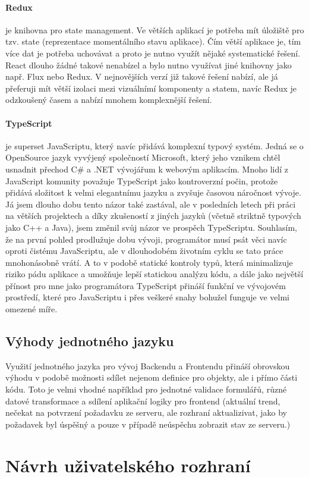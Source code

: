 \paragraph{Redux} je knihovna pro state management. Ve větších aplikací je potřeba mít úložiště pro tzv. state (reprezentace momentálního stavu aplikace). Čím větší aplikace je, tím více dat je potřeba uchovávat a proto je nutno využít nějaké systematické řešení. React dlouho žádné takové nenabízel a bylo nutno využívat jiné knihovny jako např. Flux nebo Redux. V nejnovějších verzí již takové řešení nabízí, ale já přeferuji mít větší izolaci mezi vizuálnímí komponenty a statem, navíc Redux je odzkoušený časem a nabízí mnohem komplexnější řešení.

\paragraph{TypeScript} je superset JavaScriptu, který navíc přidává komplexní typový systém. Jedná se o OpenSource jazyk vyvýjený společností Microsoft, který jeho vznikem chtěl usnadnit přechod C\# a .NET vývojářum k webovým aplikacím. Mnoho lidí z JavaScript komunity považuje TypeScript jako kontroverzní počin, protože přidává složitost k velmi elegantnímu jazyku a zvyšuje časovou náročnost vývoje. Já jsem dlouho dobu tento názor také zastával, ale v posledních letech při práci na větších projektech a díky zkušeností z jiných jazyků (včetně striktně typových jako C++ a Java), jsem změnil svůj názor ve prospěch TypeScriptu. Souhlasím, že na první pohled prodlužuje dobu vývoji, programátor musí psát věci navíc oproti čistému JavaScriptu, ale v dlouhodobém životním cyklu se tato práce  mnohonásobně vrátí. A to v podobě statické kontroly typů, která minimalizuje riziko pádu aplikace a umožňuje  lepší statickou analýzu kódu, a dále jako největší přínost pro mne jako programátora TypeScript přináší funkční  ve vývojovém prostředí, které pro JavaScriptu i přes veškeré snahy bohužel funguje ve velmi omezené míře.

\subsection{Výhody jednotného jazyku}
Využití jednotného jazyka pro vývoj Backendu a Frontendu přináší obrovskou výhodu v podobě možnosti sdílet nejenom definice pro objekty, ale i přímo části kódu. Toto je velmi vhodné například pro jednotné validace formulářů, různé datové transformace a sdílení aplikační logiky pro frontend  (aktuální trend, nečekat na potvrzení požadavku ze serveru, ale rozhraní aktualizivat, jako by požadavek byl úspěšný a pouze v případě neúspěchu zobrazit stav ze serveru.)

\section{Návrh uživatelského rozhraní}